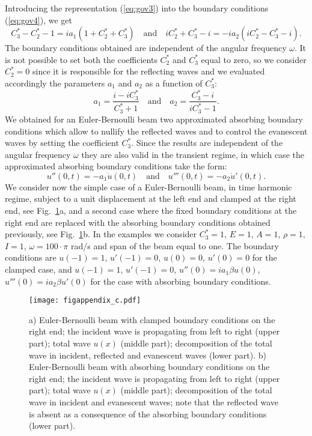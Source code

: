 \documentclass[11pt]{article}
\begin{document}
Introducing the representation (\ref{eq:gov3}) into the boundary conditions (\ref{eq:gov4}), we get
%
\begin{equation}
\label{eq:gov5}
C_3^*-C_2^*-1=ia_1(1+C_2^*+C_3^*) \quad \textrm{and} \quad iC_2^*+C_3^*-i = -ia_2(iC_2^*-C_3^*-i).
\end{equation}
%
The boundary conditions obtained are independent of the angular frequency $\omega$.
It is not possible to set both the coefficients $C_2^*$ and $C_3^*$ equal to zero, so we consider $C_2^*=0$ since it is responsible for the reflecting waves and we evaluated accordingly the parameters $a_1$ and $a_2$ as a function of $C_3^*$:
%
\begin{equation}
\label{eq:gov6}
a_1=\frac{i-iC_3^*}{C_3^*+1} \quad \textrm{and} \quad a_2=\frac{C_3^*-i}{iC_3^*-1}.
\end{equation}
%
We obtained for an Euler-Bernoulli beam two approximated absorbing boundary conditions which allow to nullify the reflected waves and to control the evanescent waves by setting the coefficient $C_3^*$. Since the results are independent of the angular frequency $\omega$ they are also valid in the transient regime, in which case the approximated absorbing boundary conditions take the form:
\begin{equation}
\label{eq:gov7}
u''(0,t)=-a_1\dot{u}(0,t) \quad \textrm{and} \quad u'''(0,t)=-a_2\dot{u}'(0,t).
\end{equation}
We consider now the simple case of a Euler-Bernoulli beam, in time harmonic regime, subject to a unit displacement at the left end and clamped at the right end, see Fig.~\ref{figappendix}a, and a second case where the fixed boundary conditions at the right end are replaced with the absorbing boundary conditions obtained previously, see Fig.~\ref{figappendix}b. In the examples we consider $C_3^*=1$, $E=1$, $A=1$, $\rho=1$, $I=1$, $\omega=100\!\cdot\!\pi$ rad/s and span of the beam equal to one. The boundary conditions are $u(-1)=1$, $u'(-1)=0$, $u(0)=0$, $u'(0)=0$ for the clamped case, and $u(-1)=1$, $u'(-1)=0$, $u''(0)=ia_1\beta u(0)$, $u'''(0)=ia_2\beta u'(0)$ for the case with absorbing boundary conditions.

\begin{figure}[!htb]
\centering
\texttt{[image: figappendix\_c.pdf]}
\caption{\footnotesize a) Euler-Bernoulli beam with clamped boundary conditions on the right end; the incident wave is propagating from left to right (upper part); total wave $u(x)$ (middle part); decomposition of the total wave in incident, reflected and evanescent waves (lower part). b) Euler-Bernoulli beam with absorbing boundary conditions on the right end; the incident wave is propagating from left to right (upper part); total wave $u(x)$ (middle part); decomposition of the total wave in incident  and evanescent waves; note that the reflected wave is absent as a consequence of the absorbing boundary conditions (lower part).}
\label{figappendix}
\end{figure}
\end{document}
